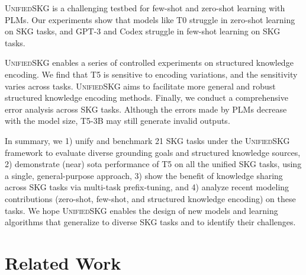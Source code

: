 \textsc{Unified}SKG is a challenging testbed for few-shot \cite{brown2020language,Ye2021CrossFitAF} and zero-shot learning \cite{Zhong2021AdaptingLM,Jason2021,sanh2021multitask} with PLMs. Our experiments show that models like T0 \cite{sanh2021multitask} struggle in zero-shot learning on SKG tasks, and GPT-3 \cite{brown2020language} and Codex \cite{chen2021evaluating} struggle in few-shot learning on SKG tasks.

\textsc{Unified}SKG enables a series of controlled experiments on structured knowledge encoding. We find that T5 is sensitive to encoding variations, and the sensitivity varies across tasks.
\textsc{Unified}SKG aims to facilitate more general and robust structured knowledge encoding methods. Finally, we conduct a comprehensive error analysis across SKG tasks. Although the errors made by PLMs decrease with the model size, T5-3B may still generate invalid outputs. 

In summary, we 1) unify and benchmark 21 SKG tasks under the \textsc{Unified}SKG framework to evaluate diverse grounding goals and structured knowledge sources, 2) demonstrate (near) sota performance of T5 on all the unified SKG tasks, using a single, general-purpose approach, 3) show the benefit of knowledge sharing across SKG tasks via multi-task prefix-tuning, and 4) analyze recent modeling contributions (zero-shot, few-shot, and structured knowledge encoding) on these tasks. We hope \textsc{Unified}SKG enables the design of new models and learning algorithms that generalize to diverse SKG tasks and to identify their challenges.

\section{Related Work}
\label{sec:related-work}

